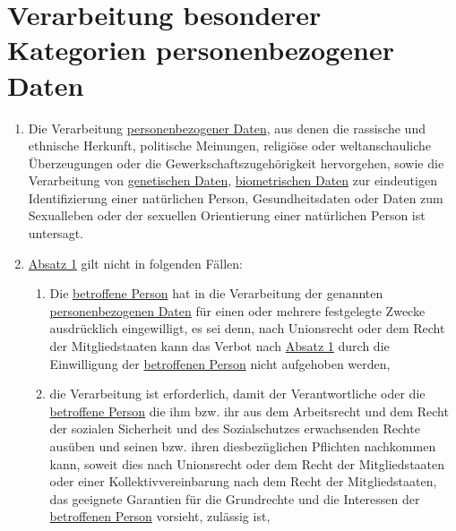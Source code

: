 \chapter{Verarbeitung besonderer Kategorien personenbezogener Daten}
\label{ch:9}


\begin{enumerate}

  \item Die Verarbeitung \hyperref[itm:04-1]{personenbezogener Daten}, aus denen die rassische und ethnische Herkunft, politische Meinungen,
   religiöse oder weltanschauliche Überzeugungen oder die Gewerkschaftszugehörigkeit hervorgehen, sowie die
   Verarbeitung von \hyperref[itm:04-13]{genetischen Daten}, \hyperref[itm:04-14]{biometrischen Daten} zur eindeutigen Identifizierung einer natürlichen Person,
   Gesundheitsdaten oder Daten zum Sexualleben oder der sexuellen Orientierung einer natürlichen Person ist untersagt.
  \label{itm:09-1}

  \item \hyperref[itm:09-1]{Absatz 1} gilt nicht in folgenden Fällen:
  \label{itm:09-2}

  \begin{enumerate}
  
    \item Die \hyperref[itm:04-1]{betroffene Person} hat in die Verarbeitung der genannten \hyperref[itm:04-1]{personenbezogenen Daten} für einen oder mehrere
     festgelegte Zwecke ausdrücklich eingewilligt, es sei denn, nach Unionsrecht oder dem Recht der Mitgliedstaaten
     kann das Verbot nach \hyperref[itm:09-1]{Absatz 1} durch die Einwilligung der \hyperref[itm:04-1]{betroffenen Person} nicht aufgehoben
     werden,
    \label{itm:09-2a}

    \item die Verarbeitung ist erforderlich, damit der Verantwortliche oder die \hyperref[itm:04-1]{betroffene Person} die ihm bzw. ihr aus
     dem Arbeitsrecht und dem Recht der sozialen Sicherheit und des Sozialschutzes erwachsenden Rechte ausüben und
     seinen bzw. ihren diesbezüglichen Pflichten nachkommen kann, soweit dies nach Unionsrecht oder dem Recht der
     Mitgliedstaaten oder einer Kollektivvereinbarung nach dem Recht der Mitgliedstaaten, das geeignete Garantien für
     die Grundrechte und die Interessen der \hyperref[itm:04-1]{betroffenen Person} vorsieht, zulässig ist,
    \label{itm:09-2b}


\end{enumerate}
\end{enumerate}
